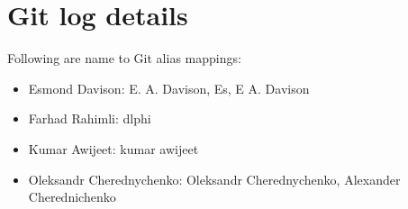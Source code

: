 \section{Git log details}
Following are name to Git alias mappings:

\begin{itemize}
   \item Esmond Davison: E. A. Davison, Es, E A. Davison
   \item Farhad Rahimli: dlphi
   \item Kumar Awijeet: kumar awijeet
   \item Oleksandr Cherednychenko: Oleksandr Cherednychenko,  Alexander Cherednichenko
\end{itemize}
